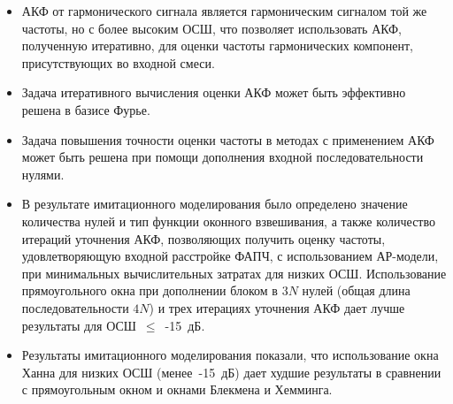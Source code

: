 \begin{itemize}
\item АКФ от гармонического сигнала является гармоническим сигналом той же частоты, но с более высоким ОСШ, что позволяет использовать АКФ, полученную итеративно,
	для оценки частоты гармонических компонент, присутствующих во входной смеси.

\item Задача итеративного вычисления оценки АКФ может быть эффективно решена в базисе Фурье.

\item Задача повышения точности оценки частоты в методах с применением АКФ может быть решена при помощи дополнения входной последовательности нулями.

\item В результате имитационного моделирования было определено значение количества нулей и тип функции оконного взвешивания, а также количество итераций уточнения АКФ,
	позволяющих получить оценку частоты, удовлетворяющую входной расстройке ФАПЧ, с использованием АР-модели, при минимальных вычислительных затратах для низких ОСШ.
	Использование прямоугольного окна при дополнении блоком в ${3N}$ нулей (общая длина последовательности ${4N}$) и трех итерациях уточнения АКФ дает лучше результаты
	для  \mbox{ОСШ ${\le}$ -15 дБ.}

\item Результаты имитационного моделирования показали, что использование окна Ханна для низких ОСШ \mbox{(менее -15 дБ)} дает худшие результаты в сравнении с прямоугольным
	окном и окнами Блекмена и Хемминга.

\end{itemize}

\clearpage
{}			%

\clearpage
